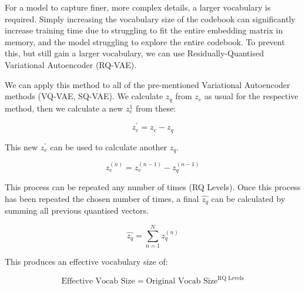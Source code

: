 For a model to capture finer, more complex details, a larger vocabulary is required.
Simply increasing the vocabulary size of the codebook can significantly increase training time due to struggling to fit the entire embedding matrix in memory, and the model struggling to explore the entire codebook.
To prevent this, but still gain a larger vocabulary, we can use Residually-Quantised Variational Autoencoder (RQ-VAE).

We can apply this method to all of the pre-mentioned Variational Autoencoder methods (VQ-VAE, SQ-VAE).
We calculate $z_q$ from $z_e$ as usual for the respective method, then we calculate a new $z_e^{1}$ from these:

\begin{equation}
z_e^{'} = z_e - z_q
\end{equation}

This new $z_e^{'}$ can be used to calculate another $z_q$.

\begin{equation}
z_e^{(n)} = z_e^{(n-1)} - z_q^{(n-1)}
\end{equation}

This process can be repeated any number of times (RQ Levels).
Once this process has been repeated the chosen number of times, a final $\hat{z_q}$ can be calculated by summing all previous quantised vectors.

\begin{equation}
\hat{z_q} = \sum_{n=1}^N z_q^{(n)}
\end{equation}

This produces an effective vocabulary size of:

\begin{equation}
 \text{Effective Vocab Size} = \text{Original Vocab Size}^{\text{RQ Levels}} 
\end{equation}
